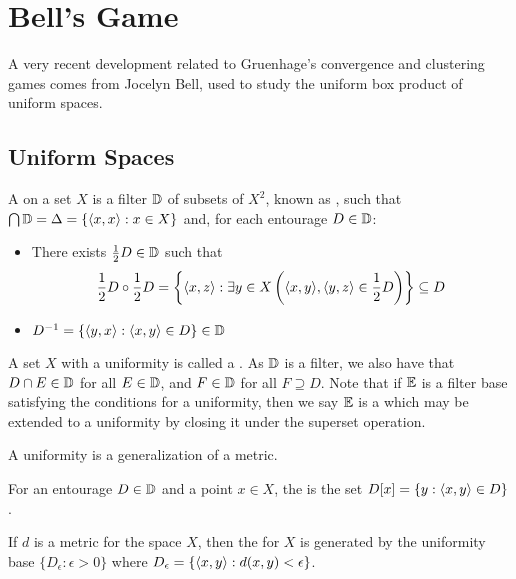 
\chapter{Bell's Game}

A very recent development related to Gruenhage's convergence and
clustering games comes from
Jocelyn Bell, used to study the uniform box product of uniform spaces.



\section{Uniform Spaces}

\begin{defn}
  A  on a set $X$ is a filter $\mathbb{D}$ of subsets of $X^2$,
  known as , such that $\bigcap\mathbb{D}=\Delta=\{\langle x,x\rangle:x\in X\}$
  and, for each entourage $D\in\mathbb{D}$:
  \begin{itemize}
    \item There exists $\frac{1}{2}D\in\mathbb{D}$ such that
      \[
        \frac{1}{2}D\circ\frac{1}{2}D
          =
        \left\{\langle x,z\rangle:\exists y\in X\left(\langle x,y\rangle,\langle y,z\rangle\in\frac{1}{2}D\right)\right\}
          \subseteq
        D
      \]
    \item $D^{-1}=\{\langle y,x\rangle:\langle x,y\rangle\in D\}\in \mathbb{D}$
  \end{itemize}
\end{defn}

A set $X$ with a uniformity is called a .
As $\mathbb{D}$ is a filter, we also have that $D\cap E\in \mathbb{D}$ for all
$E\in\mathbb{D}$, and $F\in \mathbb{D}$ for all $F\supseteq D$. Note that if $\mathbb{E}$ is
a filter base satisfying the conditions for a uniformity, then we say
$\mathbb{E}$ is a  which may be extended to a uniformity by
closing it under the superset operation.

A uniformity is a generalization of a metric.

\begin{defn}
  For an entourage $D\in\mathbb{D}$ and a point $x\in X$, the
   is the set $D[x]=\{y:\langle x,y\rangle\in D\}$.
\end{defn}

\begin{defn}
  If $d$ is a metric for the space $X$, then the  for
  $X$ is generated by the uniformity base $\{D_\epsilon:\epsilon>0\}$
  where $D_\epsilon = \{\langle x,y\rangle:d(x,y)<\epsilon\}$.
\end{defn}

